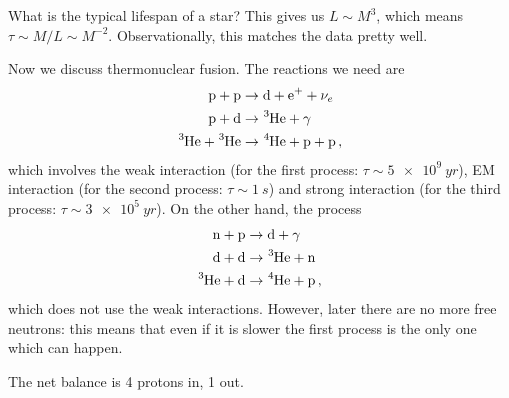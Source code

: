 \documentclass[main.tex]{subfiles}
\begin{document}
What is the typical lifespan of a star? This gives us \(L \sim M^3\), which means \(\tau \sim M/L \sim M^{-2}\). 
Observationally, this matches the data pretty well. 

Now we discuss thermonuclear fusion. The reactions we need are 
%
\begin{align}
  \ce{p + p} &\rightarrow \ce{d + e+ +} \nu_e  \\
  \ce{p + d} &\rightarrow \ce{^3He +} \gamma  \\
  \ce{^3He + ^3He} &\rightarrow \ce{^4He + p + p} 
\,,
\end{align}
%
which involves the weak interaction (for the first process: \(\tau \sim \SI{5e9}{yr}\)), EM interaction (for the second process: \(\tau \sim \SI{1}{s}\)) and strong interaction (for the third process: \(\tau \sim  \SI{3e5}{yr}\)). On the other hand, the process 
%
\begin{align}
  \ce{n + p} &\rightarrow \ce{d} + \gamma   \\
  \ce{d + d} &\rightarrow \ce{^3He + n}  \\
  \ce{^3He + d}  &\rightarrow \ce{^4He + p}
\,,
\end{align}
%
which does not use the weak interactions. However, later there are no more free neutrons: this means that even if it is slower the first process is the only one which can happen. 

The net balance is 4 protons in, 1  out. 
\end{document}

